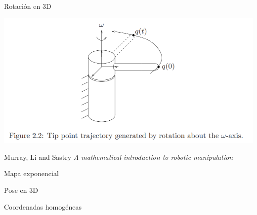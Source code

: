 \documentclass[presentation,aspectratio=169]{beamer}
\begin{document}
\begin{frame}[label={sec:org96ac22c}]{Rotación en 3D}
\begin{center}
\includegraphics[height=0.5\textheight]{../figures/MLS-fig2.2.png}

\footnotesize Murray, Li and Sastry \emph{A mathematical introduction to robotic manipulation}
\end{center}
\end{frame}

\begin{frame}[label={sec:org91921d2}]{Mapa exponencial}
\end{frame}


\begin{frame}[label={sec:org1826315}]{Pose en 3D}
\end{frame}

\begin{frame}[label={sec:org5d0efb5}]{Coordenadas homogéneas}
\end{frame}
\end{document}
